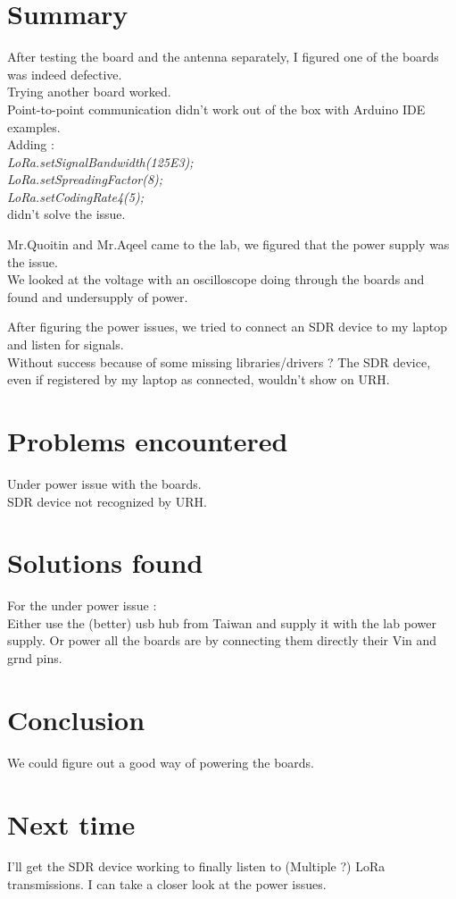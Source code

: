 \documentclass[a4paper, 12pt]{article}
\begin{document}
\section{Summary}
After testing the board and the antenna separately, I figured one of the boards was indeed defective.\\ Trying another board worked. \\
Point-to-point communication didn't work out of the box with Arduino IDE examples.\\ Adding : \\
\emph{
LoRa.setSignalBandwidth(125E3); \\
LoRa.setSpreadingFactor(8);  \\
LoRa.setCodingRate4(5);}\\
didn't solve the issue.

Mr.Quoitin and Mr.Aqeel came to the lab, we figured that the power supply was the issue.\\
We looked at the voltage with an oscilloscope doing through the boards and found and undersupply of power. 

After figuring the power issues, we tried to connect an SDR device to my laptop and listen for signals.\\
Without success because of some missing libraries/drivers ?
The SDR device, even if registered by my laptop as connected, wouldn't show on URH.


\section{Problems encountered} 
Under power issue with the boards.\\
SDR device not recognized by URH.

\section{Solutions found}
For the under power issue :\\
Either use the (better) usb hub from Taiwan and supply it with the lab power supply.
Or power all the boards are by connecting them directly their Vin and grnd pins.

\section{Conclusion}
We could figure out a good way of powering the boards.


\section{Next time}
I'll get the SDR device working to finally listen to (Multiple ?) LoRa transmissions.
I can take a closer look at the power issues.
\end{document}
